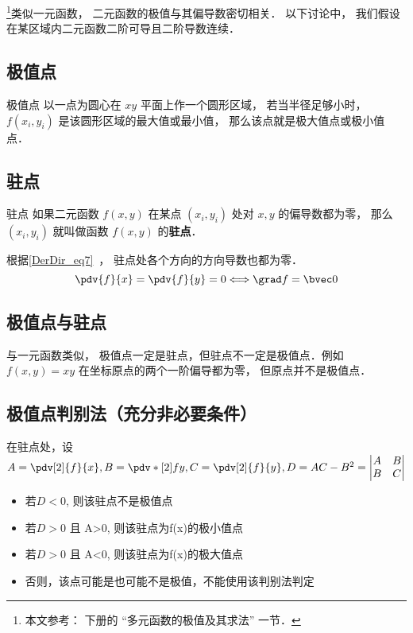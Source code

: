 

\footnote{本文参考： \cite{同济高} 下册的 “多元函数的极值及其求法” 一节．}类似一元函数， 二元函数的极值与其偏导数密切相关． 以下讨论中， 我们假设在某区域内二元函数二阶可导且二阶导数连续．

\subsection{极值点}
\begin{definition}{极值点}
以一点为圆心在 $xy$ 平面上作一个圆形区域， 若当半径足够小时， $f(x_i, y_i)$ 是该圆形区域的最大值或最小值， 那么该点就是极大值点或极小值点． 
\end{definition}

\subsection{驻点}
\begin{definition}{驻点}
如果二元函数 $f(x,y)$ 在某点 $(x_i, y_i)$ 处对 $x, y$ 的偏导数都为零， 那么 $(x_i, y_i)$ 就叫做函数 $f(x,y)$ 的\textbf{驻点}． 
\end{definition}
根据\autoref{DerDir_eq7}~， 驻点处各个方向的方向导数也都为零．
\begin{equation}
\pdv{f}{x}=\pdv{f}{y}=0 \Longleftrightarrow \grad f=\bvec0
\end{equation}

\subsection{极值点与驻点}
与一元函数类似， 极值点一定是驻点，但驻点不一定是极值点．例如 $f(x,y) = xy$ 在坐标原点的两个一阶偏导都为零， 但原点并不是极值点． 
\subsection{极值点判别法（充分非必要条件\cite{同济高}）}
在驻点处，设$A=\pdv[2]{f}{x}, B=\pdv*[2]{f}{y}, C=\pdv[2]{f}{y}, D=AC-B^2=
\left | \begin{matrix}
A&B\\
B&C\\
\end{matrix} \right | $ 

\begin{itemize}
\item 若$D<0$, 则该驻点不是极值点
\item 若$D>0$ 且 A>0, 则该驻点为f(x)的极小值点
\item 若$D>0$ 且 A<0, 则该驻点为f(x)的极大值点
\item 否则，该点可能是也可能不是极值，不能使用该判别法判定
\end{itemize}

